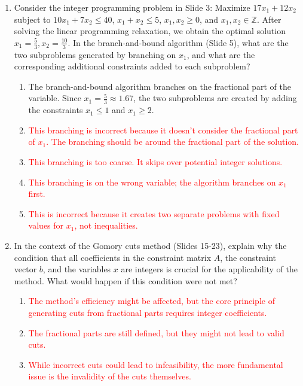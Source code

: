 \documentclass{article}%
\newcommand{\incorrect}[1]{\textcolor{red}{#1}}
\begin{document}
\begin{enumerate}
\begin{enumerate}
\end{enumerate}%
\vspace{1em}%
\item Consider the integer programming problem in Slide 3: Maximize $17x_1 + 12x_2$ subject to $10x_1 + 7x_2 \le 40$, $x_1 + x_2 \le 5$, $x_1, x_2 \ge 0$, and $x_1, x_2 \in \mathbb{Z}$.  After solving the linear programming relaxation, we obtain the optimal solution $x_1 = \frac{5}{3}, x_2 = \frac{10}{3}$.  In the branch-and-bound algorithm (Slide 5), what are the two subproblems generated by branching on $x_1$, and what are the corresponding additional constraints added to each subproblem?%
\begin{enumerate}%
\item The branch-and-bound algorithm branches on the fractional part of the variable. Since $x_1 = \frac{5}{3} \approx 1.67$, the two subproblems are created by adding the constraints $x_1 \le 1$ and $x_1 \ge 2$.%
\item \incorrect{This branching is incorrect because it doesn't consider the fractional part of $x_1$. The branching should be around the fractional part of the solution.}%
\item \incorrect{This branching is too coarse.  It skips over potential integer solutions.}%
\item \incorrect{This branching is on the wrong variable; the algorithm branches on $x_1$ first.}%
\item \incorrect{This is incorrect because it creates two separate problems with fixed values for $x_1$, not inequalities.}%
\end{enumerate}%
\vspace{1em}%
\item In the context of the Gomory cuts method (Slides 15-23), explain why the condition that all coefficients in the constraint matrix $A$, the constraint vector $b$, and the variables $x$ are integers is crucial for the applicability of the method.  What would happen if this condition were not met?%
\begin{enumerate}%
\item \incorrect{The method's efficiency might be affected, but the core principle of generating cuts from fractional parts requires integer coefficients.}%
\item \incorrect{The fractional parts are still defined, but they might not lead to valid cuts.}%
\item \incorrect{While incorrect cuts could lead to infeasibility, the more fundamental issue is the invalidity of the cuts themselves.}%

\end{enumerate}
\end{enumerate}
\end{document}
